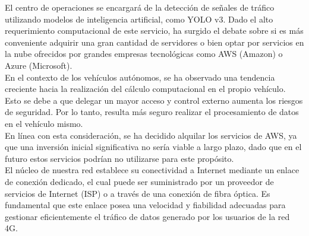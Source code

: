 El centro de operaciones se encargará de la detección de señales de tráfico utilizando modelos de inteligencia artificial, como YOLO v3. Dado el alto requerimiento computacional de este servicio, ha surgido el debate sobre si es más conveniente adquirir una gran cantidad de servidores o bien optar por servicios en la nube ofrecidos por grandes empresas tecnológicas como AWS (Amazon) o Azure (Microsoft).\\

En el contexto de los vehículos autónomos, se ha observado una tendencia creciente hacia la realización del cálculo computacional en el propio vehículo. Esto se debe a que delegar un mayor acceso y control externo aumenta los riesgos de seguridad. Por lo tanto, resulta más seguro realizar el procesamiento de datos en el vehículo mismo.\\

En línea con esta consideración, se ha decidido alquilar los servicios de AWS, ya que una inversión inicial significativa no sería viable a largo plazo, dado que en el futuro estos servicios podrían no utilizarse para este propósito.\\

El núcleo de nuestra red establece su conectividad a Internet mediante un enlace de conexión dedicado, el cual puede ser suministrado por un proveedor de servicios de Internet (ISP) o a través de una conexión de fibra óptica. Es fundamental que este enlace posea una velocidad y fiabilidad adecuadas para gestionar eficientemente el tráfico de datos generado por los usuarios de la red 4G.
